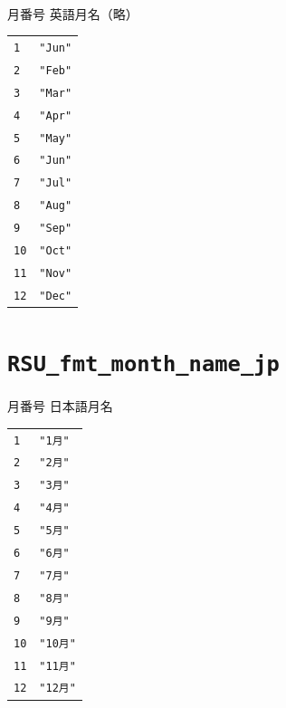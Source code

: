 \paragraph{\DocStrTitleRDMPredefinedFormatConversion}月番号  英語月名（略）
\begin{center}
\begin{xltabular}{\textwidth}{|p{7truecm}|X|}
\hline
\thead{\DocStrHeaderFormatInput}&\thead{\DocStrHeaderFormatOutput}\\
\hline
\hline
\texttt{1}&\texttt{"Jun"}\\
\hline
\texttt{2}&\texttt{"Feb"}\\
\hline
\texttt{3}&\texttt{"Mar"}\\
\hline
\texttt{4}&\texttt{"Apr"}\\
\hline
\texttt{5}&\texttt{"May"}\\
\hline
\texttt{6}&\texttt{"Jun"}\\
\hline
\texttt{7}&\texttt{"Jul"}\\
\hline
\texttt{8}&\texttt{"Aug"}\\
\hline
\texttt{9}&\texttt{"Sep"}\\
\hline
\texttt{10}&\texttt{"Oct"}\\
\hline
\texttt{11}&\texttt{"Nov"}\\
\hline
\texttt{12}&\texttt{"Dec"}\\
\hline
\end{xltabular}
\end{center}
\section{\texttt{RSU\_fmt\_month\_name\_jp}}
\paragraph{\DocStrTitleRDMPredefinedFormatConversion}月番号  日本語月名
\begin{center}
\begin{xltabular}{\textwidth}{|p{7truecm}|X|}
\hline
\thead{\DocStrHeaderFormatInput}&\thead{\DocStrHeaderFormatOutput}\\
\hline
\hline
\texttt{1}&\texttt{"1月"}\\
\hline
\texttt{2}&\texttt{"2月"}\\
\hline
\texttt{3}&\texttt{"3月"}\\
\hline
\texttt{4}&\texttt{"4月"}\\
\hline
\texttt{5}&\texttt{"5月"}\\
\hline
\texttt{6}&\texttt{"6月"}\\
\hline
\texttt{7}&\texttt{"7月"}\\
\hline
\texttt{8}&\texttt{"8月"}\\
\hline
\texttt{9}&\texttt{"9月"}\\
\hline
\texttt{10}&\texttt{"10月"}\\
\hline
\texttt{11}&\texttt{"11月"}\\
\hline
\texttt{12}&\texttt{"12月"}\\
\hline
\end{xltabular}
\end{center}
